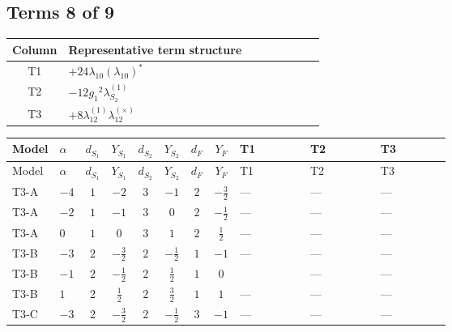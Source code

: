 \documentclass[8pt]{article}
\begin{document}
\begin{landscape}
\subsection*{Terms 8 of 9}
\begin{center}
\begin{tabular}{@{}c >{\raggedright\arraybackslash}p{0.82\linewidth}@{}}
\toprule
Column & Representative term structure \\
\midrule
T1 & \(\displaystyle +24 {\lambda_{10}} \left({\lambda_{10}}\right)^{*}\) \\
\midrule
T2 & \(\displaystyle -12 {g_1}^2 {\lambda_{S_2}^{(1)}}\) \\
\midrule
T3 & \(\displaystyle +8 {\lambda_{12}^{(1)}} {\lambda_{12}^{(\times)}}\) \\
\midrule
\bottomrule
\end{tabular}
\end{center}
\smallskip
\tiny
\begin{longtable}{@{}llcccccc >{\raggedright\arraybackslash}p{0.21\linewidth} >{\raggedright\arraybackslash}p{0.21\linewidth} >{\raggedright\arraybackslash}p{0.21\linewidth}@{}}
\toprule
Model & $\alpha$ & $d_{S_1}$ & $Y_{S_1}$ & $d_{S_2}$ & $Y_{S_2}$ & $d_F$ & $Y_F$ & T1 & T2 & T3 \\
\midrule
\endfirsthead
\toprule
Model & $\alpha$ & $d_{S_1}$ & $Y_{S_1}$ & $d_{S_2}$ & $Y_{S_2}$ & $d_F$ & $Y_F$ & T1 & T2 & T3 \\
\midrule
\endhead
T3-A & $-4$ & $1$ & $-2$ & $3$ & $-1$ & $2$ & $-\frac{3}{2}$ & --- & --- & --- \\
\midrule
T3-A & $-2$ & $1$ & $-1$ & $3$ & $0$ & $2$ & $-\frac{1}{2}$ & --- & --- & --- \\
\midrule
T3-A & $0$ & $1$ & $0$ & $3$ & $1$ & $2$ & $\frac{1}{2}$ & --- & --- & --- \\
\midrule
T3-B & $-3$ & $2$ & $-\frac{3}{2}$ & $2$ & $-\frac{1}{2}$ & $1$ & $-1$ & --- & --- & --- \\
\midrule
T3-B & $-1$ & $2$ & $-\frac{1}{2}$ & $2$ & $\frac{1}{2}$ & $1$ & $0$ & \scriptsize\adjustbox{max width=\linewidth}{$\begin{gathered} +24 {\lambda_{10}} \left({\lambda_{10}}\right)^{*}\end{gathered}$} & --- & --- \\
\midrule
T3-B & $1$ & $2$ & $\frac{1}{2}$ & $2$ & $\frac{3}{2}$ & $1$ & $1$ & --- & --- & --- \\
\midrule
T3-C & $-3$ & $2$ & $-\frac{3}{2}$ & $2$ & $-\frac{1}{2}$ & $3$ & $-1$ & --- & --- & --- \\

\end{longtable}
\end{landscape}
\end{document}
